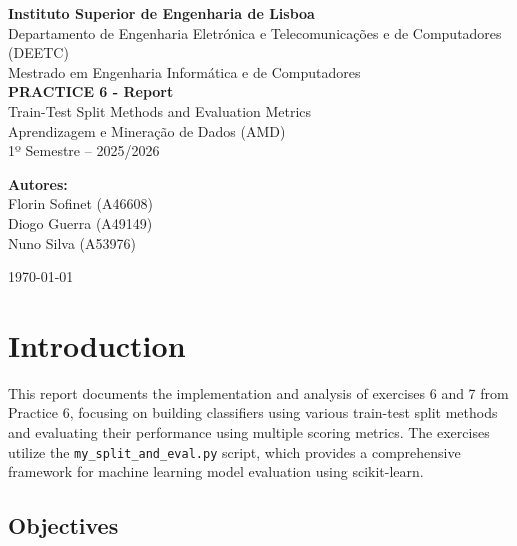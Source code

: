 \documentclass[12pt,a4paper]{article}
\begin{document}
\begin{titlepage}
    \centering
    \vspace*{1cm}
    
    {\Large \textbf{Instituto Superior de Engenharia de Lisboa}}\\[0.5cm]
    
    {\large Departamento de Engenharia Eletrónica e Telecomunicações e de Computadores (DEETC)}\\[1cm]
    
    {\large Mestrado em Engenharia Informática e de Computadores}\\[2cm]
    
    {\LARGE \textbf{PRACTICE 6 - Report}}\\[0.5cm]
    {\Large Train-Test Split Methods and Evaluation Metrics}\\[1.5cm]
    
    {\Large Aprendizagem e Mineração de Dados (AMD)}\\[0.3cm]
    {\large 1º Semestre -- 2025/2026}\\[3cm]
    
    \vfill
    
    {\large \textbf{Autores:}}\\[0.2cm]
    {\large
        Florin Sofinet (A46608)\\
        Diogo Guerra (A49149)\\
        Nuno Silva (A53976)
    }
    
    \vfill
    
    {\large \today}
    
\end{titlepage}

\tableofcontents
\newpage

\section{Introduction}

This report documents the implementation and analysis of exercises 6 and 7 from Practice 6, focusing on building classifiers using various train-test split methods and evaluating their performance using multiple scoring metrics. The exercises utilize the \texttt{my\_split\_and\_eval.py} script, which provides a comprehensive framework for machine learning model evaluation using scikit-learn.

\subsection{Objectives}
\end{document}

